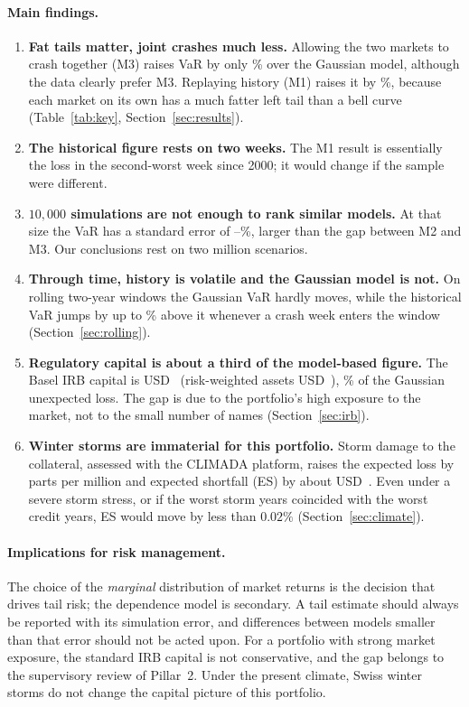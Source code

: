 \paragraph{Main findings.}
\begin{enumerate}
\item \textbf{Fat tails matter, joint crashes much less.} Allowing the two markets to crash together (M3) raises VaR by only \% over the Gaussian model, although the data clearly prefer M3. Replaying history (M1) raises it by \%, because each market on its own has a much fatter left tail than a bell curve (Table~\ref{tab:key}, Section~\ref{sec:results}).
\item \textbf{The historical figure rests on two weeks.} The M1 result is essentially the loss in the second-worst week since 2000; it would change if the sample were different.
\item \textbf{$10{,}000$ simulations are not enough to rank similar models.} At that size the VaR has a standard error of --\%, larger than the gap between M2 and M3. Our conclusions rest on two million scenarios.
\item \textbf{Through time, history is volatile and the Gaussian model is not.} On rolling two-year windows the Gaussian VaR hardly moves, while the historical VaR jumps by up to \% above it whenever a crash week enters the window (Section~\ref{sec:rolling}).
\item \textbf{Regulatory capital is about a third of the model-based figure.} The Basel IRB capital is USD~ (risk-weighted assets USD~), \% of the Gaussian unexpected loss. The gap is due to the portfolio's high exposure to the market, not to the small number of names (Section~\ref{sec:irb}).
\item \textbf{Winter storms are immaterial for this portfolio.} Storm damage to the collateral, assessed with the CLIMADA platform, raises the expected loss by  parts per million and expected shortfall (ES) by about USD~. Even under a severe storm stress, or if the worst storm years coincided with the worst credit years, ES would move by less than $0.02\%$ (Section~\ref{sec:climate}).
\end{enumerate}

\paragraph{Implications for risk management.}
The choice of the \emph{marginal} distribution of market returns is the decision that drives tail risk; the dependence model is secondary. A tail estimate should always be reported with its simulation error, and differences between models smaller than that error should not be acted upon. For a portfolio with strong market exposure, the standard IRB capital is not conservative, and the gap belongs to the supervisory review of Pillar~2. Under the present climate, Swiss winter storms do not change the capital picture of this portfolio.

